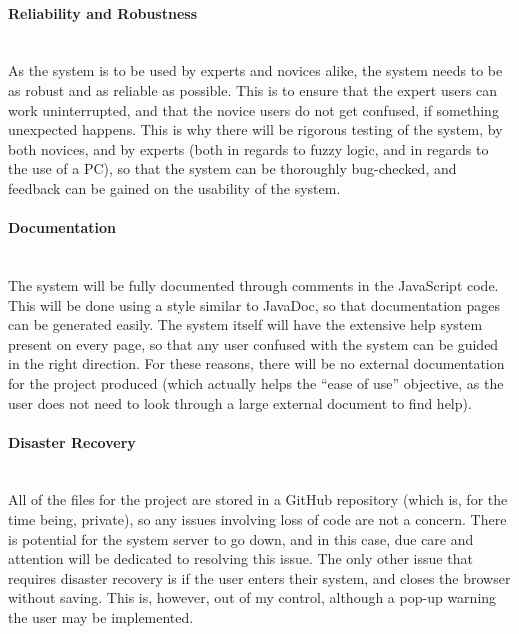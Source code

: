 \paragraph{Reliability and Robustness}\ \\
As the system is to be used by experts and novices alike, the system needs to be as robust and as reliable as possible. This is to ensure that the expert users can work uninterrupted, and that the novice users do not get confused, if something unexpected happens. This is why there will be rigorous testing of the system, by both novices, and by experts (both in regards to fuzzy logic, and in regards to the use of a PC), so that the system can be thoroughly bug-checked, and feedback can be gained on the usability of the system.

\paragraph{Documentation}\ \\
The system will be fully documented through comments in the JavaScript code. This will be done using a style similar to JavaDoc, so that documentation pages can be generated easily. The system itself will have the extensive help system present on every page, so that any user confused with the system can be guided in the right direction. For these reasons, there will be no external documentation for the project produced (which actually helps the ``ease of use'' objective, as the user does not need to look through a large external document to find help).

\paragraph{Disaster Recovery}\ \\
All of the files for the project are stored in a GitHub repository (which is, for the time being, private), so any issues involving loss of code are not a concern. There is potential for the system server to go down, and in this case, due care and attention will be dedicated to resolving this issue. The only other issue that requires disaster recovery is if the user enters their system, and closes the browser without saving. This is, however, out of my control, although a pop-up warning the user may be implemented.

\newpage 
